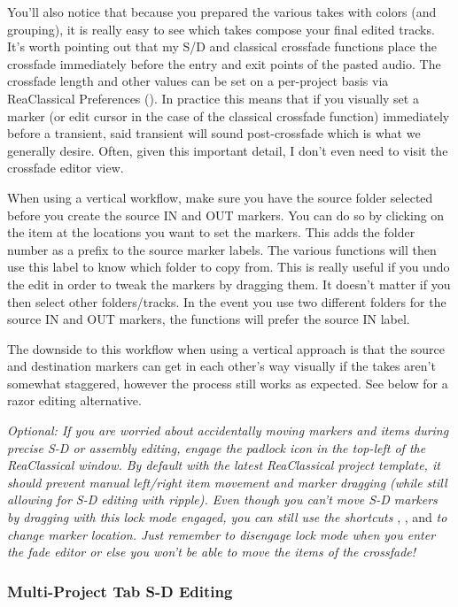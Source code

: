 \documentclass[10pt,american]{article}
\begin{document}
You'll also notice that because you prepared the various takes with colors (and
grouping), it is really easy to see which takes compose your final edited
tracks. It's worth pointing out that my S/D and classical crossfade functions
place the crossfade immediately before the entry and exit points of the pasted
audio. The crossfade length and other values can be set on a per-project basis
via ReaClassical Preferences (). In practice this means that if you
visually set a marker (or edit cursor in the case of the classical crossfade
function) immediately before a transient, said transient will sound
post-crossfade which is what we generally desire. Often, given this important
detail, I don't even need to visit the crossfade editor view.

When using a vertical workflow, make sure you have the source folder selected
before you create the source IN and OUT markers. You can do so by clicking on
the item at the locations you want to set the markers. This adds the folder
number as a prefix to the source marker labels. The various functions will then
use this label to know which folder to copy from. This is really useful if you
undo the edit in order to tweak the markers by dragging them. It doesn't matter
if you then select other folders/tracks. In the event you use two different
folders for the source IN and OUT markers, the functions will prefer the source
IN label.

The downside to this workflow when using a vertical approach is that the source
and destination markers can get in each other's way visually if the takes aren't
somewhat staggered, however the process still works as expected. See below for a
razor editing alternative.

\emph{Optional: If you are worried about accidentally moving markers and items
during precise S-D or assembly editing, engage the padlock icon in the top-left
of the ReaClassical window. By default with the latest ReaClassical project
template, it should prevent manual left/right item movement and marker dragging
(while still allowing for S-D editing with ripple). Even though you can't move
S-D markers by dragging with this lock mode engaged, you can still use the
shortcuts }, ,  and \emph{ to change marker
location. Just remember to disengage lock mode when you enter the fade editor or
else you won't be able to move the items of the crossfade!}

\subsubsection{\label{subsec:Multi-Project-Tab-S-D}Multi-Project Tab S-D
Editing}
\end{document}
